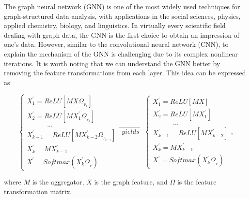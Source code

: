 \documentclass[preprint,11pt]{elsarticle}
\begin{document}
The graph neural network (GNN) is one of the most widely used techniques for graph-structured data analysis, with applications in the social sciences, physics, applied chemistry, biology, and linguistics. In virtually every scientific field dealing with graph data, the GNN is the first choice to obtain an impression of one’s data. However, similar to the convolutional neural network (CNN), to explain the mechanism of the GNN is challenging due to its complex nonlinear iterations. It is worth noting that we can understand the GNN better by removing the feature transformations from each layer. This idea can be expressed as
\begin{small}
\begin{equation}
\left\{ 
\begin{array}{l}
X_{1}^{'} = ReLU[MX\Omega_{_{F_{1}}}] \\ 
X_{2}^{'} = ReLU[MX_{1}^{'}\Omega_{_{F_{2}}}] \\ 
                  \quad  \quad \quad ... \\
X_{k-1}^{'} = ReLU[MX_{k-2}^{'}\Omega_{_{F_{k-1}}}] \\
X_{k}^{'} = MX_{k-1}^{'} \\
X^{'} = Softmax(X_{k}^{'} \Omega_{_F})
\end{array}
\right.
\overrightarrow{\ \ yields\ \ } \ 
\left\{ 
\begin{array}{l}
X_{1}^{'} = ReLU[M X] \\ 
X_{2}^{'} = ReLU[M X_{1}^{'}] \\ 
                  \quad  \quad \quad ... \\
X_{k-1}^{'} = ReLU[M X_{k-2}^{'}] \\
X_{k}^{'} = M X_{k-1}^{'} \\
X^{'} = Softmax(X_{k}^{'} \Omega_{_F})
\end{array}
\right.
,
\end{equation}
\end{small}where $M$ is the aggregator, $X$ is the graph feature, and $\Omega$ is the feature transformation matrix.
\end{document}
